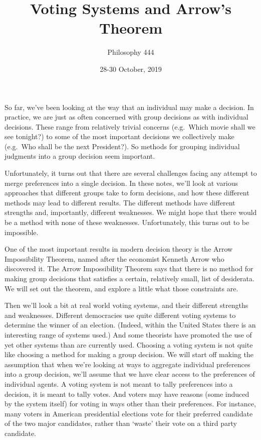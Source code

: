 \documentclass[11pt,]{article}
\title{Voting Systems and Arrow's Theorem}
\author{Philosophy 444}
\date{28-30 October, 2019}
\begin{document}
\maketitle

So far, we've been looking at the way that an individual may make a
decision. In practice, we are just as often concerned with group
decisions as with individual decisions. These range from relatively
trivial concerns (e.g.~Which movie shall we see tonight?) to some of the
most important decisions we collectively make (e.g.~Who shall be the
next President?). So methods for grouping individual judgments into a
group decision seem important.

Unfortunately, it turns out that there are several challenges facing any
attempt to merge preferences into a single decision. In these notes,
we'll look at various approaches that different groups take to form
decisions, and how these different methods may lead to different
results. The different methods have different strengths and,
importantly, different weaknesses. We might hope that there would be a
method with none of these weaknesses. Unfortunately, this turns out to
be impossible.

One of the most important results in modern decision theory is the Arrow
Impossibility Theorem, named after the economist Kenneth Arrow who
discovered it. The Arrow Impossibility Theorem says that there is no
method for making group decisions that satisfies a certain, relatively
small, list of desiderata. We will set out the theorem, and explore a
little what those constraints are.

Then we'll look a bit at real world voting systems, and their different
strengths and weaknesses. Different democracies use quite different
voting systems to determine the winner of an election. (Indeed, within
the United States there is an interesting range of systems used.) And
some theorists have promoted the use of yet other systems than are
currently used. Choosing a voting system is not quite like choosing a
method for making a group decision. We will start off making the
assumption that when we're looking at ways to aggregate individual
preferences into a group decision, we'll assume that we have clear
access to the preferences of individual agents. A voting system is not
meant to tally preferences into a decision, it is meant to tally votes.
And voters may have reasons (some induced by the system itself) for
voting in ways other than their preferences. For instance, many voters
in American presidential elections vote for their preferred candidate of
the two major candidates, rather than `waste' their vote on a third
party candidate.
\end{document}
